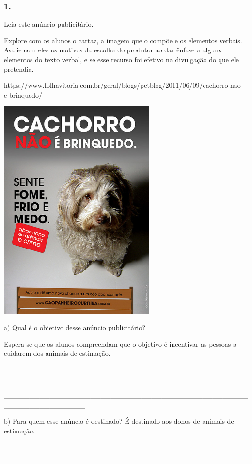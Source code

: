 \subsubsection{1. }\label{section-39}

Leia este anúncio publicitário.

Explore com os alunos o cartaz, a imagem que o compõe e os elementos
verbais. Avalie com eles os motivos da escolha do produtor ao dar ênfase
a alguns elementos do texto verbal, e se esse recurso foi efetivo na
divulgação do que ele pretendia.

https://www.folhavitoria.com.br/geral/blogs/petblog/2011/06/09/cachorro-nao-e-brinquedo/

\includegraphics[width=3.11354in,height=4.44792in]{media/image9.jpeg}

a) Qual é o objetivo desse anúncio publicitário?

Espera-se que os alunos compreendam que o objetivo é incentivar as
pessoas a cuidarem dos animais de estimação.

\_\_\_\_\_\_\_\_\_\_\_\_\_\_\_\_\_\_\_\_\_\_\_\_\_\_\_\_\_\_\_\_\_\_\_\_\_\_\_\_\_\_\_\_\_\_\_\_\_\_\_\_\_\_\_\_\_\_\_\_\_\_\_\_

\_\_\_\_\_\_\_\_\_\_\_\_\_\_\_\_\_\_\_\_\_\_\_\_\_\_\_\_\_\_\_\_\_\_\_\_\_\_\_\_\_\_\_\_\_\_\_\_\_\_\_\_\_\_\_\_\_\_\_\_\_\_\_\_

b) Para quem esse anúncio é destinado? É destinado aos donos de animais
de estimação.

\_\_\_\_\_\_\_\_\_\_\_\_\_\_\_\_\_\_\_\_\_\_\_\_\_\_\_\_\_\_\_\_\_\_\_\_\_\_\_\_\_\_\_\_\_\_\_\_\_\_\_\_\_\_\_\_\_\_\_\_\_\_\_\_

